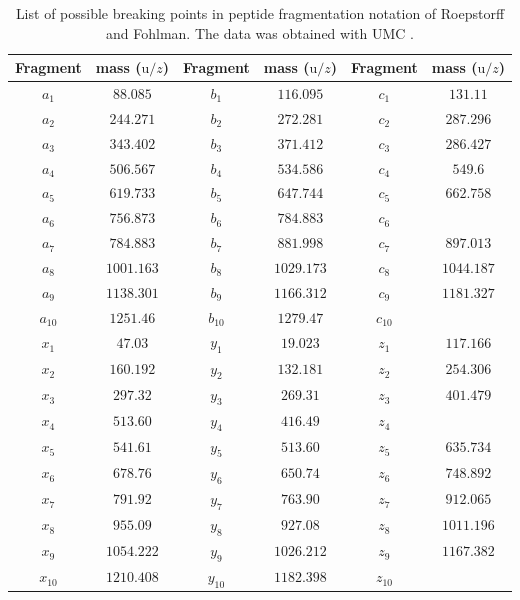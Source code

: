 \documentclass[a4paper,10pt]{article}
\begin{document}
\begin{appendices}
\begin{table}[htp!]
	\centering
	\caption{List of possible breaking points in peptide fragmentation notation of Roepstorff and Fohlman. The data was obtained with UMC \cite{umc}. }
	\begin{tabular}{c | c | c | c | c | c}
		Fragment & mass (${\mathrm{u}}/{z}$) & Fragment & mass (${\mathrm{u}}/{z}$) & Fragment & mass (${\mathrm{u}}/{z}$) \\ \hline
		$a_1$ & $88.085$ & $b_1$ & $116.095$ & $c_1$ & $131.11$ \\
		$a_2$ & $244.271$ & $b_2$ & $272.281$ & $c_2$ & $287.296$ \\
		$a_3$ & $343.402$ & $b_3$ & $371.412$ & $c_3$ & $286.427$ \\
		$a_4$ & $506.567$ & $b_4$ & $534.586$ & $c_4$ & $549.6$ \\
		$a_5$ & $619.733$ & $b_5$ & $647.744$ & $c_5$ & $662.758$ \\
		$a_6$ & $756.873$ & $b_6$ & $784.883$ & $c_6$ &  \\
		$a_7$ & $784.883$ & $b_7$ & $881.998$ & $c_7$ & $897.013$ \\
		$a_8$ & $1001.163$ & $b_8$ & $1029.173$ & $c_8$ & $1044.187$ \\
		$a_9$ & $1138.301$ & $b_9$ & $1166.312$ & $c_9$ & $1181.327$ \\
		$a_{10}$ & $1251.46$ & $b_{10}$ & $1279.47$ & $c_{10}$ &  \\
		$x_{1}$ & $47.03$ & $y_{1}$ & $19.023$ & $z_{1}$ & $117.166$ \\
    $x_{2}$ & $160.192$ & $y_{2}$ & $132.181$ & $z_{2}$ & $254.306$ \\
    $x_{3}$ & $297.32$ & $y_{3}$ & $269.31$ & $z_{3}$ & $401.479$ \\
    $x_{4}$ & $513.60$ & $y_{4}$ & $416.49$ & $z_{4}$ &  \\
    $x_{5}$ & $541.61$ & $y_{5}$ & $513.60$ & $z_{5}$ & $635.734$ \\
    $x_{6}$ & $678.76$ & $y_{6}$ & $650.74$ & $z_{6}$ & $748.892$ \\
    $x_{7}$ & $791.92$ & $y_{7}$ & $763.90$ & $z_{7}$ & $912.065$ \\
    $x_{8}$ & $955.09$ & $y_{8}$ & $927.08$ & $z_{8}$ & $1011.196$ \\
    $x_{9}$ & $1054.222$ & $y_{9}$ & $1026.212$ & $z_{9}$ & $1167.382$ \\
    $x_{10}$ & $1210.408$ & $y_{10}$ & $1182.398$ & $z_{10}$ & $$ \\
	\end{tabular}
	\label{tab_fragments}
\end{table}


\end{appendices}
\end{document}
